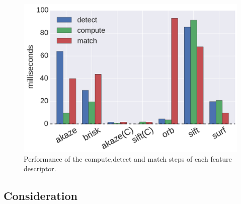 
\begin{figure}[t]
	\includegraphics[width=0.95\linewidth]{imgs/performances.pdf}
\vspace{-2.5mm}	
\caption{Performance of the compute,detect and match steps of each feature descriptor.}
\label{fig:speed_b}
\end{figure}


\subsection{Consideration}

